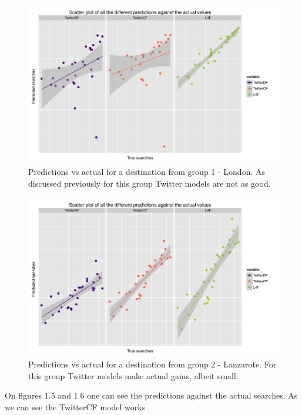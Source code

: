 \documentclass[minf,frontabs,twoside,singlespacing,parskip]{infthesis}
\begin{document}
\begin{figure}[h!]
\begin{center}
\includegraphics[scale=0.5]{plots/London}
\end{center}
\caption{Predictions vs actual for a destination from group 1 - London. As discussed previously for this group Twitter models are not as good.}
\end{figure}

\begin{figure}[h!]
\begin{center}
\includegraphics[scale=0.5]{plots/lanzarote}
\end{center}
\caption{Predictions vs actual for a destination from group 2 - Lanzarote. For this group Twitter models make actual gains, albeit small.}
\end{figure}

On figures 1.5 and 1.6 one can see the predictions against the actual searches. As we can see the TwitterCF model works 
\end{document}

